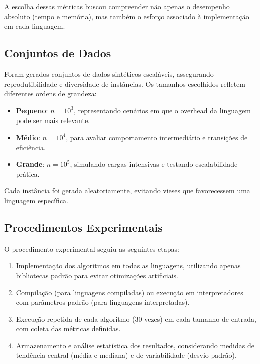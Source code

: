 \documentclass[12pt, a4paper]{article}
\begin{document}
A escolha dessas métricas buscou compreender não apenas o desempenho absoluto (tempo e memória), mas também o esforço associado à implementação em cada linguagem.

\subsection{Conjuntos de Dados}

Foram gerados conjuntos de dados sintéticos escaláveis, assegurando reprodutibilidade e diversidade de instâncias. Os tamanhos escolhidos refletem diferentes ordens de grandeza:

\begin{itemize}
    \item \textbf{Pequeno}: \( n = 10^3 \), representando cenários em que o overhead da linguagem pode ser mais relevante.
    \item \textbf{Médio}: \( n = 10^4 \), para avaliar comportamento intermediário e transições de eficiência.
    \item \textbf{Grande}: \( n = 10^5 \), simulando cargas intensivas e testando escalabilidade prática.
\end{itemize}

Cada instância foi gerada aleatoriamente, evitando vieses que favorecessem uma linguagem específica.

\subsection{Procedimentos Experimentais}

O procedimento experimental seguiu as seguintes etapas:

\begin{enumerate}
    \item Implementação dos algoritmos em todas as linguagens, utilizando apenas bibliotecas padrão para evitar otimizações artificiais.
    \item Compilação (para linguagens compiladas) ou execução em interpretadores com parâmetros padrão (para linguagens interpretadas).
    \item Execução repetida de cada algoritmo (30 vezes) em cada tamanho de entrada, com coleta das métricas definidas.
    \item Armazenamento e análise estatística dos resultados, considerando medidas de tendência central (média e mediana) e de variabilidade (desvio padrão).
\end{enumerate}
\end{document}
